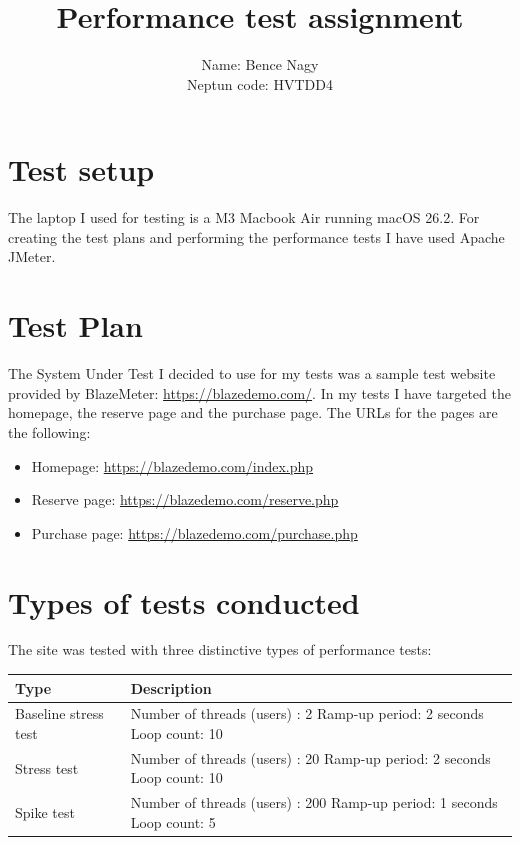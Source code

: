 \documentclass[11pt, leqno, oneside]{article}
\title{Performance test assignment}
\author{Name: Bence Nagy\\Neptun code: HVTDD4}
\date{}
\begin{document}
\maketitle

\section{Test setup}

The laptop I used for testing is a M3 Macbook Air running macOS 26.2.
For creating the test plans and performing the performance tests I have used Apache JMeter.

\section{Test Plan}
The System Under Test I decided to use for my tests was a sample test website provided by BlazeMeter: \url{https://blazedemo.com/}.
In my tests I have targeted the homepage, the reserve page and the purchase page. The URLs for the pages are the following:
\begin{itemize}
  \item Homepage: \url{https://blazedemo.com/index.php}
  \item Reserve page: \url{https://blazedemo.com/reserve.php}
  \item Purchase page: \url{https://blazedemo.com/purchase.php}
\end{itemize}


\section{Types of tests conducted}

The site was tested with three distinctive types of performance tests:

\vspace{12pt}
{\renewcommand{\arraystretch}{1.5}
\begin{tabularx}{\textwidth}{|X|X|}
  \hline
  \textbf{Type} & \textbf{Description} \\
  \hline
  Baseline stress test & Number of threads (users) : 2 \newline Ramp-up period: 2 seconds \newline Loop count: 10 \\
  \hline
  Stress test & Number of threads (users) : 20 \newline Ramp-up period: 2 seconds \newline Loop count: 10 \\
  \hline
  Spike test & Number of threads (users) : 200 \newline Ramp-up period: 1 seconds \newline Loop count: 5 \\
  \hline
\end{tabularx}}
\end{document}
